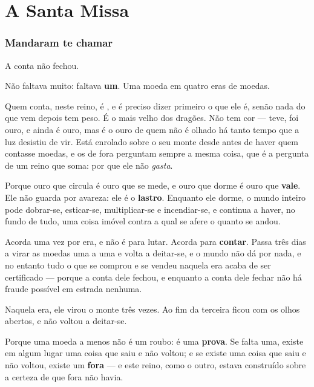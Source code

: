 \documentclass[livro.tex]{subfiles}
\begin{document}
\part{A Santa Missa}

\section{Mandaram te chamar}

A conta não fechou.

Não faltava muito: faltava \textbf{um}. Uma moeda em quatro eras de moedas.

\medskip

Quem conta, neste reino, é \Odo , e é preciso dizer primeiro o que ele é, senão nada do que vem
depois tem peso. É o mais velho dos dragões. Não tem cor --- teve, foi ouro, e ainda é ouro, mas
é o ouro de quem não é olhado há tanto tempo que a luz desistiu de vir. Está enrolado sobre o
seu monte desde antes de haver quem contasse moedas, e os de fora perguntam sempre a mesma coisa,
que é a pergunta de um reino que soma: por que ele não \emph{gasta}.

Porque ouro que circula é ouro que se mede, e ouro que dorme é ouro que \textbf{vale}. Ele não
guarda por avareza: ele é o \textbf{lastro}. Enquanto ele dorme, o mundo inteiro pode dobrar-se,
esticar-se, multiplicar-se e incendiar-se, e continua a haver, no fundo de tudo, uma coisa imóvel
contra a qual se afere o quanto se andou.

Acorda uma vez por era, e não é para lutar. Acorda para \textbf{contar}. Passa três dias a virar
as moedas uma a uma e volta a deitar-se, e o mundo não dá por nada, e no entanto tudo o que se
comprou e se vendeu naquela era acaba de ser certificado --- porque a conta dele fechou, e
enquanto a conta dele fechar não há fraude possível em estrada nenhuma.

\medskip

Naquela era, ele virou o monte três vezes. Ao fim da terceira ficou com os olhos abertos, e não
voltou a deitar-se.

Porque uma moeda a menos não é um roubo: é uma \textbf{prova}. Se falta uma, existe em algum
lugar uma coisa que saiu e não voltou; e se existe uma coisa que saiu e não voltou, existe um
\textbf{fora} --- e este reino, como o outro, estava construído sobre a certeza de que fora não
havia.
\end{document}
